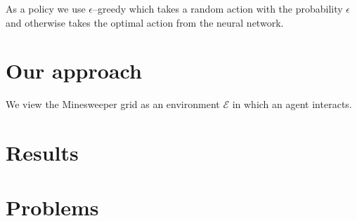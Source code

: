 As a policy we use $\epsilon$--greedy which takes a random action with the probability $\epsilon$ and otherwise takes the optimal action from the neural network.

\section{Our approach}
We view the Minesweeper grid as an environment $\mathcal{E}$ in which an agent interacts. 


\section{Results}

\section{Problems}